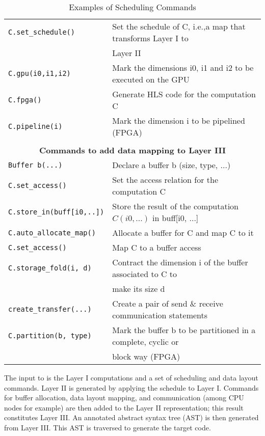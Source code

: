 \begin{table}
\begin{tabular}{l|l}
        \texttt{C.set\_schedule()} & Set the schedule of C, i.e.,a map that transforms Layer I to \\ & Layer II\\\hline
        \texttt{C.gpu(i0,i1,i2)} & Mark the dimensions i0, i1 and i2 to be executed on the GPU \\\hline
        \texttt{C.fpga()} & Generate HLS code for the computation C\\\hline
        \texttt{C.pipeline(i)} & Mark the dimension i to be pipelined (FPGA)\\\hline
        \multicolumn{2}{c}{} \\
        \multicolumn{2}{c}{\textbf{Commands to add data mapping to Layer III}} \\\hline
        \texttt{Buffer b(...)} & Declare a buffer b (size, type, ...) \\\hline
        \texttt{C.set\_access()} & Set the access relation for the computation C
        \\\hline
        \texttt{C.store\_in(buff[i0,..])} & Store the result of the computation $C(i0, ...)$ in buff[i0, ...]
        \\\hline
        \texttt{C.auto\_allocate\_map()} & Allocate a buffer for C and map C to it\\ \hline
        \texttt{C.set\_access()} & Map C to a buffer access\\ \hline
        \texttt{C.storage\_fold(i, d)} & Contract the dimension i of the buffer associated to C to \\
        & make its size d \\\hline
        \texttt{create\_transfer(...)} & Create a pair of send \& receive communication statements \\
        \hline
        \texttt{C.partition(b, type)} & Mark the buffer b to be partitioned in a complete, cyclic or \\ & block way (FPGA)\\\hline
    \end{tabular}
    \caption{Examples of \framework{} Scheduling Commands}
    \label{tab:scheduling}
    \vspace{-0.5cm}
\end{table}




The input to \framework{} is the Layer I computations and a set of scheduling and data layout commands.  Layer II is generated by applying the schedule to Layer I.
Commands for buffer allocation, data layout mapping, and communication (among CPU nodes for example) are then added to the Layer II representation; this result constitutes Layer III. An annotated abstract syntax tree (AST) is then generated from Layer III.  This AST is traversed to generate the target code.

